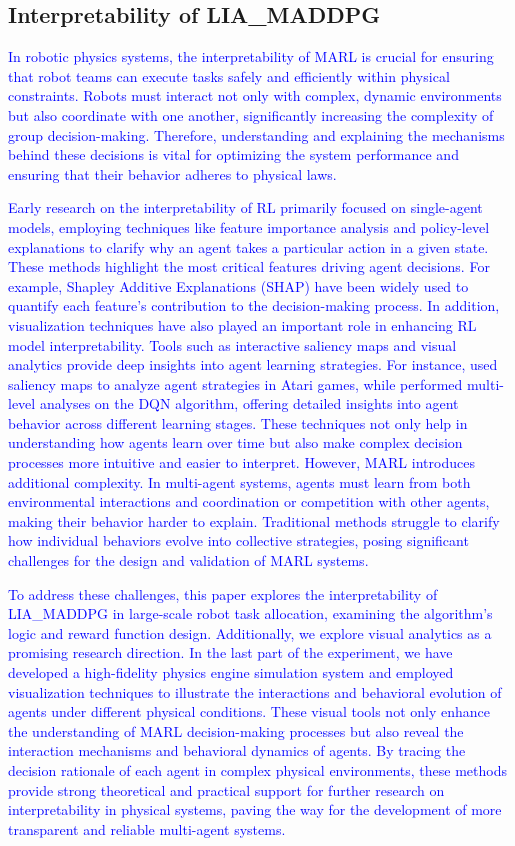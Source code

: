 \documentclass[lettersize,journal]{IEEEtran}
\newcommand{\blue}[1]{\textcolor{blue}{#1}}
\begin{document}
\subsection{ Interpretability of LIA\_MADDPG}\label{subsection d}
\blue{In robotic physics systems, the interpretability of MARL is crucial for ensuring that robot teams can execute tasks safely and efficiently within physical constraints. Robots must interact not only with complex, dynamic environments but also coordinate with one another, significantly increasing the complexity of group decision-making. Therefore, understanding and explaining the mechanisms behind these decisions is vital for optimizing the system performance and ensuring that their behavior adheres to physical laws.}

\blue{Early research on the interpretability of RL primarily focused on single-agent models, employing techniques like feature importance analysis and policy-level explanations to clarify why an agent takes a particular action in a given state. These methods highlight the most critical features driving agent decisions. For example, Shapley Additive Explanations (SHAP)\cite{lundberg2017unified} have been widely used to quantify each feature’s contribution to the decision-making process. In addition, visualization techniques have also played an important role in enhancing RL model interpretability. Tools such as interactive saliency maps and visual analytics provide deep insights into agent learning strategies. For instance, \cite{wang2021visual} used saliency maps to analyze agent strategies in Atari games, while \cite{wang2018dqnviz} performed multi-level analyses on the DQN algorithm, offering detailed insights into agent behavior across different learning stages. These techniques not only help in understanding how agents learn over time but also make complex decision processes more intuitive and easier to interpret. However, MARL introduces additional complexity. In multi-agent systems, agents must learn from both environmental interactions and coordination or competition with other agents, making their behavior harder to explain. Traditional methods struggle to clarify how individual behaviors evolve into collective strategies, posing significant challenges for the design and validation of MARL systems.}

\blue{To address these challenges, this paper explores the interpretability of LIA\_MADDPG in large-scale robot task allocation, examining the algorithm's logic and reward function design. Additionally, we explore visual analytics as a promising research direction. In the last part of the experiment, we have developed a high-fidelity physics engine simulation system and employed visualization techniques to illustrate the interactions and behavioral evolution of agents under different physical conditions. These visual tools not only enhance the understanding of MARL decision-making processes but also reveal the interaction mechanisms and behavioral dynamics of agents. By tracing the decision rationale of each agent in complex physical environments, these methods provide strong theoretical and practical support for further research on interpretability in physical systems, paving the way for the development of more transparent and reliable multi-agent systems.}
\end{document}
